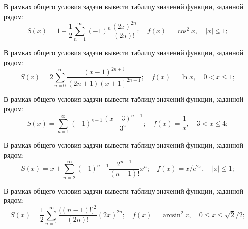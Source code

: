 
\begin{zztask}
В рамках общего условия задачи вывести таблицу значений функции, заданной рядом:
\[ %
  S(x)= 1 + \frac{1}{2} \sum_{n=1}^\infty (-1)^n \frac{(2x)^{2n}}{(2n)!};\quad
  f(x)= \cos^2 x,
  \quad |x| \leq 1;
\]
\end{zztask}


\begin{zztask}
В рамках общего условия задачи вывести таблицу значений функции, заданной рядом:
\[
  S(x)= 2 \sum_{n=0}^\infty \frac{(x-1)^{2n+1}}{(2n+1)(x+1)^{2n+1}};\quad
  f(x)= \ln x,
  \quad 0 < x \leq 1;
\]
\end{zztask}


\begin{zztask}
В рамках общего условия задачи вывести таблицу значений функции, заданной рядом:
\[
  S(x)= \sum_{n=1}^\infty (-1)^{n+1}\frac{(x-3)^{n-1}}{3^n};\quad
  f(x)= \frac{1}{x},
  \quad 3 < x \leq 4;
\]
\end{zztask}


\begin{zztask}
В рамках общего условия задачи вывести таблицу значений функции, заданной рядом:
\[
  S(x)= x + \sum_{n=2}^\infty (-1)^{n-1}\frac{2^{n-1}}{(n-1)!} x^n;\quad
  f(x)= x/e^{2x},
  \quad |x| \leq 1;
\]
\end{zztask}


\begin{zztask}
В рамках общего условия задачи вывести таблицу значений функции, заданной рядом:
\[
  S(x)= \frac{1}{2} \sum_{n=1}^\infty \frac{\big((n-1)!\big)^2}{(2n)!} (2x)^{2n};\quad
  f(x)= \arcsin^2x,
  \quad 0 \leq x \leq \sqrt2/2;
\]
\end{zztask}

